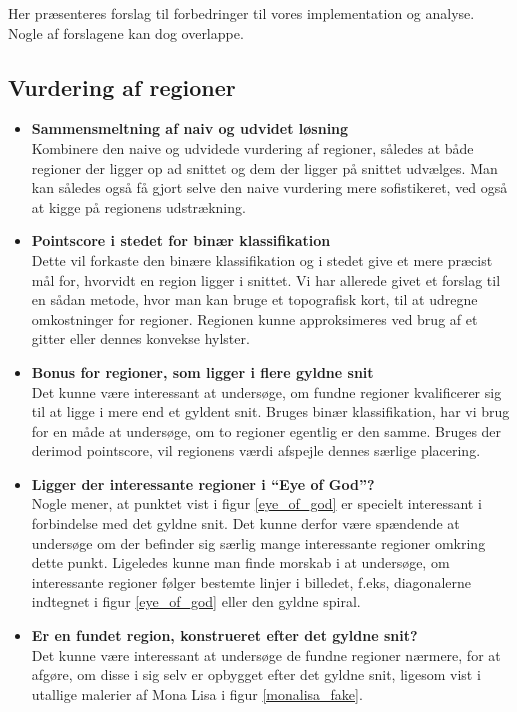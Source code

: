 {
{\sffamily Her præsenteres forslag til forbedringer til vores
implementation og analyse. Nogle af forslagene kan dog overlappe.
}

\subsection{Vurdering af regioner}
\begin{itemize}
    \item \textbf{Sammensmeltning af naiv og udvidet løsning}\\
        Kombinere den naive og udvidede vurdering af regioner, således
        at både regioner der ligger op ad snittet og dem der ligger på
        snittet udvælges. Man kan således også få gjort selve den naive
        vurdering mere sofistikeret, ved også at kigge på regionens
        udstrækning.
    \item \textbf{Pointscore i stedet for binær klassifikation}\\
        Dette vil forkaste den binære klassifikation og i stedet give et
        mere præcist mål for, hvorvidt en region ligger i snittet.  Vi
        har allerede givet et forslag til en sådan metode, hvor man kan
        bruge et topografisk kort, til at udregne omkostninger for
        regioner.  Regionen kunne approksimeres ved brug af et gitter
        eller dennes konvekse hylster.
    \item \textbf{Bonus for regioner, som ligger i flere gyldne snit}\\
        Det kunne være interessant at undersøge, om fundne regioner
        kvalificerer sig til at ligge i mere end et gyldent snit. Bruges
        binær klassifikation, har vi brug for en måde at undersøge, om
        to regioner egentlig er den samme. Bruges der derimod
        pointscore, vil regionens værdi afspejle dennes særlige
        placering.
    \item \textbf{Ligger der interessante regioner i ``Eye of God''?}\\
        Nogle mener, at punktet vist i figur \ref{eye_of_god} er
        specielt interessant i forbindelse med det gyldne snit. Det
        kunne derfor være spændende at undersøge om der befinder sig
        særlig mange interessante regioner omkring dette punkt.
        Ligeledes kunne man finde morskab i at undersøge, om
        interessante regioner følger bestemte linjer i billedet, f.eks,
        diagonalerne indtegnet i figur \ref{eye_of_god} eller den gyldne
        spiral.
    \item \textbf{Er en fundet region, konstrueret efter det gyldne snit?}\\
        Det kunne være interessant at undersøge de fundne regioner
        nærmere, for at afgøre, om disse i sig selv er opbygget efter
        det gyldne snit, ligesom vist i utallige malerier af Mona Lisa i
        figur \ref{monalisa_fake}.
\end{itemize}

}
